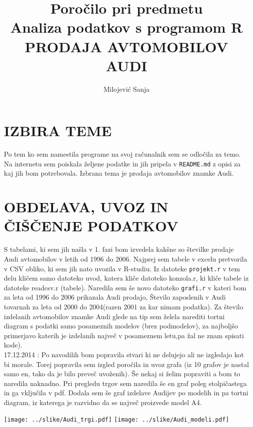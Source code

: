 \documentclass[11pt,a4paper]{article}
\begin{document}
\title{Poročilo pri predmetu \\
Analiza podatkov s programom R\\
PRODAJA AVTOMOBILOV AUDI}
\author{Milojević Sanja}
\maketitle

\section{IZBIRA TEME}
Po tem ko sem namestila programe na svoj računalnik sem se odločila za temo. Na internetu sem poiskala željene podatke in jih pripela v \verb|README.md| z opisi za kaj jih bom potrebovala. Izbrana tema je prodaja avtomobilov znamke Audi.

\section{OBDELAVA, UVOZ IN ČIŠČENJE PODATKOV}
S tabelami, ki sem jih našla v 1. fazi bom izvedela kakšne so številke prodaje Audi avtomobilov v letih od 1996 do 2006. Najprej sem tabele v excelu pretvorila v CSV obliko, ki sem jih nato uvozila v R-studiu. Iz datoteke \verb|projekt.r| v tem delu kličem samo datoteko uvod, katera kliče datoteko konzola.r, ki kliče tabele iz datoteke readcsv.r (tabele).
Naredila sem še novo datoteko \verb|grafi.r| v kateri bom za leta od 1996 do 2006 prikazala Audi prodajo, Število zaposlenih v Audi tovarnah za leta od 2000 do 2004(razen 2001 za kar nimam podatka). Za število izdelanih avtomobilov znamke Audi glede na tip sem želela narediti tortni diagram s podatki samo posameznih modelov (brez podmodelov), za najboljšo primerjavo katerih je izdelanih največ v posameznem letu,pa žal ne znam spisati kode).\\
17.12.2014 : Po navodilih bom popravila stvari ki ne delujejo ali ne izgledajo kot bi morale. Torej popravila sem izgled poročila in uvoz grafa (iz 10 grafov je nastal samo en, tako da je bilo preveč uvoženih). Še nekaj si želim popraviti a bom to naredila naknadno.
Pri pregledu trgov sem naredila še en graf poleg stolpičastega in ga vključila v pdf. Dodala sem še graf izdelave Audijev po modelih in pa tortni diagram, iz katerega je razvidno da se največ proizvede model A4.

\texttt{[image: ../slike/Audi\_trgi.pdf]}
\texttt{[image: ../slike/Audi\_modeli.pdf]}
\end{document}

